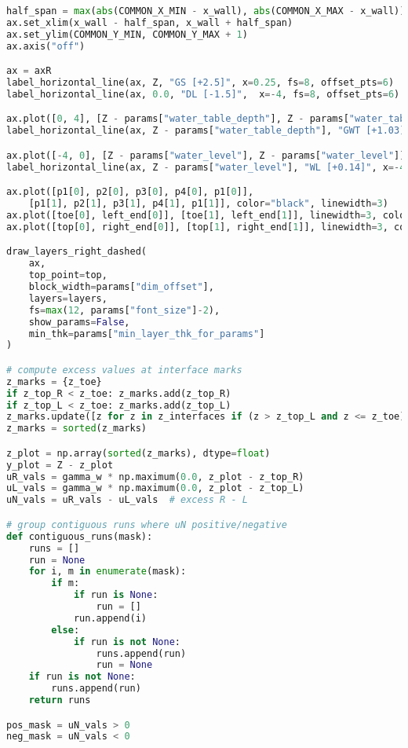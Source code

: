 \begin{lstlisting}[language=Python]
half_span = max(abs(COMMON_X_MIN - x_wall), abs(COMMON_X_MAX - x_wall))
ax.set_xlim(x_wall - half_span, x_wall + half_span)
ax.set_ylim(COMMON_Y_MIN, COMMON_Y_MAX + 1)
ax.axis("off")

ax = axR
label_horizontal_line(ax, Z, "GS [+2.5]", x=0.25, fs=8, offset_pts=6)
label_horizontal_line(ax, 0.0, "DL [-1.5]",  x=-4, fs=8, offset_pts=6)

ax.plot([0, 4], [Z - params["water_table_depth"], Z - params["water_table_depth"]], linestyle="--", linewidth=1.5, color="black")
label_horizontal_line(ax, Z - params["water_table_depth"], "GWT [+1.03]", x=0.25, fs=8, offset_pts=6)

ax.plot([-4, 0], [Z - params["water_level"], Z - params["water_level"]], linestyle="--", linewidth=1.5, color="black")
label_horizontal_line(ax, Z - params["water_level"], "WL [+0.14]", x=-4, fs=8, offset_pts=6)

ax.plot([p1[0], p2[0], p3[0], p4[0], p1[0]],
    [p1[1], p2[1], p3[1], p4[1], p1[1]], color="black", linewidth=3)
ax.plot([toe[0], left_end[0]], [toe[1], left_end[1]], linewidth=3, color="black")
ax.plot([top[0], right_end[0]], [top[1], right_end[1]], linewidth=3, color="black")

draw_layers_right_dashed(
    ax,
    top_point=top,
    block_width=params["dim_offset"],
    layers=layers,
    fs=max(12, params["font_size"]-2),
    show_params=False,
    min_thk=params["min_layer_thk_for_params"]
)

# compute excess values at interface marks
z_marks = {z_toe}
if z_top_R < z_toe: z_marks.add(z_top_R)
if z_top_L < z_toe: z_marks.add(z_top_L)
z_marks.update([z for z in z_interfaces if (z > z_top_L and z <= z_toe) or (z > z_top_R and z <= z_toe)])
z_marks = sorted(z_marks)

z_plot = np.array(sorted(z_marks), dtype=float)
y_plot = Z - z_plot
uR_vals = gamma_w * np.maximum(0.0, z_plot - z_top_R)
uL_vals = gamma_w * np.maximum(0.0, z_plot - z_top_L)
uN_vals = uR_vals - uL_vals  # excess R - L

# group contiguous runs where uN positive/negative
def contiguous_runs(mask):
    runs = []
    run = None
    for i, m in enumerate(mask):
        if m:
            if run is None:
                run = []
            run.append(i)
        else:
            if run is not None:
                runs.append(run)
                run = None
    if run is not None:
        runs.append(run)
    return runs

pos_mask = uN_vals > 0
neg_mask = uN_vals < 0


\end{lstlisting}
